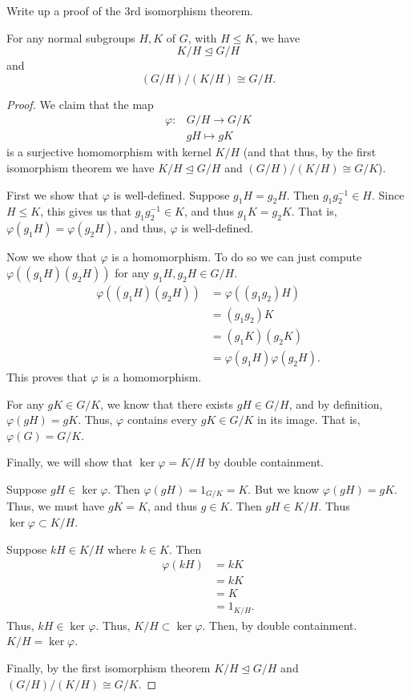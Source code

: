 \documentclass[12 pt, letterpaper]{hmcpset}
\begin{document}
\begin{problem}[3.]
	Write up a proof of the 3rd isomorphism theorem.
\end{problem}
	\begin{theorem}
		For any normal subgroups $H, K$ of $G$, with $H \le K$, we have
		\[
			K/H \trianglelefteq G/H
		\]
		and
		\[
			(G/H)/(K/H) \cong G/H. 
		\]
	\end{theorem}
	\begin{proof}
		We claim that the map
		\[
			\begin{split}
				\varphi \colon & G/H \to G/K \\
					       & gH \mapsto gK
			\end{split}
		\]
		is a surjective homomorphism with kernel $K/H$ (and that thus, by the first isomorphism theorem we have $K/H \trianglelefteq G/H$ and $(G/H)/(K/H) \cong G/K$). 

		First we show that $\varphi$ is well-defined. Suppose $g_{1} H = g_{2} H$. Then $g_{1} g_{2}^{-1} \in H$. Since $H \le K$, this gives us that $g_{1} g_{2}^{-1} \in K$, and thus $g_{1} K = g_{2} K$. That is, $\varphi(g_{1} H) = \varphi(g_{2} H)$, and thus, $\varphi$ is well-defined. 

		Now we show that $\varphi$ is a homomorphism. To do so we can just compute $\varphi((g_{1}H)(g_{2} H))$ for any $g_{1}H, g_{2}H \in G/H$.
		\[
			\begin{split}
				\varphi((g_{1}H)(g_{2}H)) & = \varphi((g_{1}g_{2})H) \\
							  & = (g_1 g_{2}) K \\
							  & = (g_{1} K) (g_{2} K) \\
							  & = \varphi(g_{1} H) \varphi(g_{2} H).
			\end{split}
		\]
		This proves that $\varphi$ is a homomorphism. 

		For any $gK \in G/K$, we know that there exists $gH \in G/H$, and by definition, $\varphi(gH) = gK$. Thus, $\varphi$ contains every $gK \in G/K$ in its image. That is, $\varphi(G) = G/K$. 

		Finally, we will show that $\ker \varphi = K/H$ by double containment. 

		Suppose $gH \in \ker \varphi$. Then $\varphi(gH) = 1_{G/K} = K$. But we know $\varphi(gH) = gK$. Thus, we must have $gK = K$, and thus $g \in K$. Then $gH \in K/H$. Thus $\ker \varphi \subset K/H$.  

		Suppose $kH \in K/H$ where $k \in K$. Then
		\[
			\begin{split}
				\varphi(kH) & = kK \\
					    & = kK \\
					    & = K \\
					    & = 1_{K/H}.
			\end{split}
		\]
		Thus, $kH \in \ker \varphi$. Thus, $K/H \subset \ker \varphi$. Then, by double containment. $K/H = \ker \varphi$. 

		Finally, by the first isomorphism theorem $K/H \trianglelefteq G/H$ and $(G/H)/(K/H) \cong G/K$.
	\end{proof}
\end{document}
